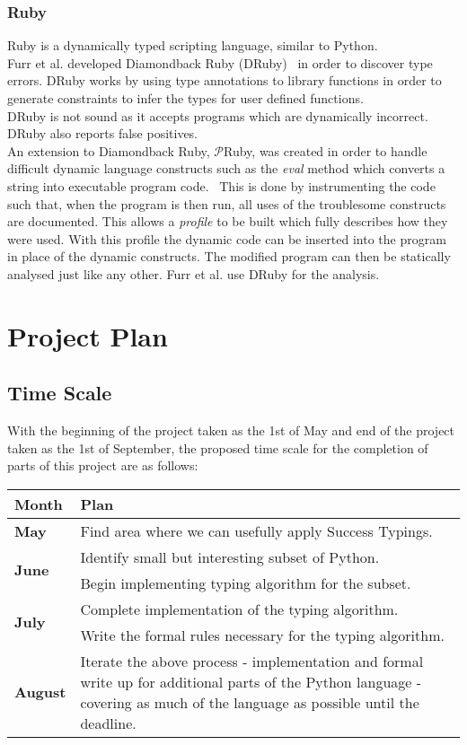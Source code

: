 \documentclass[12pt, titlepage]{article}
\begin{document}
\subsubsection{Ruby}
Ruby is a dynamically typed scripting language, similar to Python. \\
Furr et al. developed Diamondback Ruby (DRuby)~\cite{furr09} in order to discover type errors. DRuby works by using type annotations to library functions in order to generate constraints to infer the types for user defined functions. \\
DRuby is not sound as it accepts programs which are dynamically incorrect. DRuby also reports false positives. \\
An extension to Diamondback Ruby, $\mathcal{P}$Ruby, was created in order to handle difficult dynamic language constructs such as the \textit{eval} method which converts a string into executable program code.~\cite{pRuby} This is done by instrumenting the code such that, when the program is then run, all uses of the troublesome constructs are documented. This allows a \textit{profile} to be built which fully describes how they were used. With this profile the dynamic code can be inserted into the program in place of the dynamic constructs. The modified program can then be statically analysed just like any other. Furr et al. use DRuby for the analysis.

\section{Project Plan}

\subsection*{Time Scale}
With the beginning of the project taken as the 1st of May and end of the project taken as the 1st of September, the proposed time scale for the completion of parts of this project are as follows:
\begin{center}
    \begin{tabular}{| l | p{12cm} |}
    \hline
    \textbf{Month} & \textbf{Plan} \\ \hline
    \textbf{May} & Find area where we can usefully apply Success Typings. \\ \hline
    \multirow{2}{*}{\textbf{June}} & Identify small but interesting subset of Python. \\
    					              & Begin implementing typing algorithm for the subset. \\ \hline
    \multirow{2}{*}{\textbf{July}} & Complete implementation of the typing algorithm. \\
    					              & Write the formal rules necessary for the typing algorithm. \\ \hline
    \textbf{August} & Iterate the above process - implementation and formal write up for additional parts of the Python language - covering as much of the language as possible until the deadline. \\
    \hline
    \end{tabular}
\end{center}

{}

\end{document}
